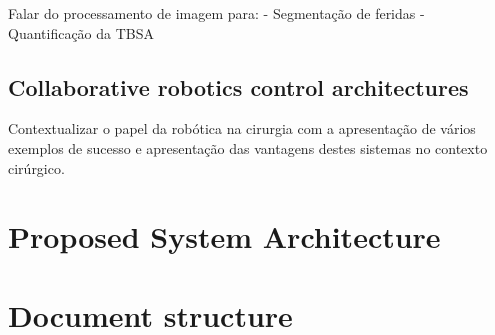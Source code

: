 Falar do processamento de imagem para:
- Segmentação de feridas
- Quantificação da TBSA


\subsection{Collaborative robotics control architectures}
\label{subsec:collaborative_robotics_control_architectures}

Contextualizar o papel da robótica na cirurgia com a apresentação de vários exemplos de sucesso e apresentação das vantagens destes sistemas no contexto cirúrgico.



\section{Proposed System Architecture} %
\label{sec:proposed_system_architecture}


\section{Document structure}
\label{sec:document_structure}

